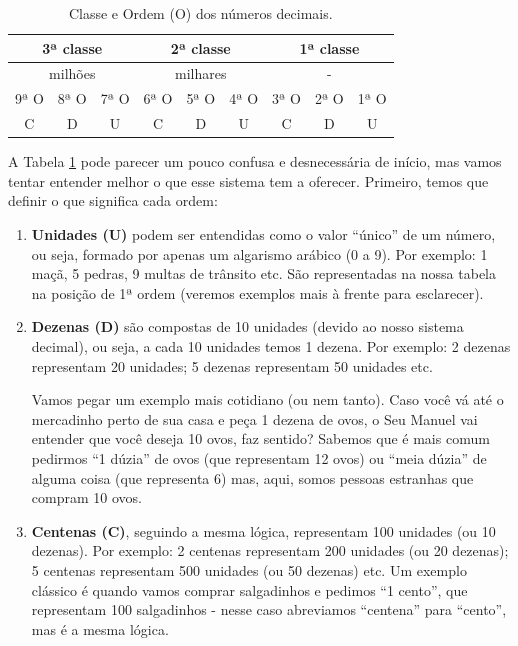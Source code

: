 \begin{table}[H]
\begin{tabular}{|ccc|ccc|ccc|}
\hline
\multicolumn{3}{|c|}{3ª classe}                               & \multicolumn{3}{c|}{2ª classe}                               & \multicolumn{3}{c|}{1ª classe}                               \\ \hline
\multicolumn{3}{|c|}{milhões}                                 & \multicolumn{3}{c|}{milhares}                                & \multicolumn{3}{c|}{-}                                       \\ \hline
\multicolumn{1}{|c|}{9ª O} & \multicolumn{1}{c|}{8ª O} & 7ª O & \multicolumn{1}{c|}{6ª O} & \multicolumn{1}{c|}{5ª O} & 4ª O & \multicolumn{1}{c|}{3ª O} & \multicolumn{1}{c|}{2ª O} & 1ª O \\ \hline
\multicolumn{1}{|c|}{C}    & \multicolumn{1}{c|}{D}    & U    & \multicolumn{1}{c|}{C}    & \multicolumn{1}{c|}{D}    & U    & \multicolumn{1}{c|}{C}    & \multicolumn{1}{c|}{D}    & U    \\ \hline
\end{tabular}

\caption{Classe e Ordem (O) dos números decimais.}
\label{ordemclasse}
\end{table}

A Tabela \ref{ordemclasse} pode parecer um pouco confusa e desnecessária de início, mas vamos tentar entender melhor o que esse sistema tem a oferecer. Primeiro, temos que definir o que significa cada ordem:

\begin{enumerate}

    \item \textbf{Unidades (U)} podem ser entendidas como o valor “único” de um número, ou seja, formado por apenas um algarismo arábico (0 a 9). Por exemplo: 1 maçã, 5 pedras, 9 multas de trânsito etc. São representadas na nossa tabela na posição de 1ª ordem (veremos exemplos mais à frente para esclarecer).
    \item \textbf{Dezenas (D)} são compostas de 10 unidades (devido ao nosso sistema decimal), ou seja, a cada 10 unidades temos 1 dezena. Por exemplo: 2 dezenas representam 20 unidades; 5 dezenas representam 50 unidades  etc. 
    
    Vamos pegar um exemplo mais cotidiano (ou nem tanto). Caso você vá até o mercadinho perto de sua casa e peça 1 dezena de ovos, o Seu Manuel vai entender que você deseja 10 ovos, faz sentido? Sabemos que é mais comum pedirmos “1 dúzia” de ovos (que representam 12 ovos) ou “meia dúzia” de alguma coisa (que representa 6) mas, aqui, somos pessoas estranhas que compram 10 ovos.
    
    \item \textbf{Centenas (C)}, seguindo a mesma lógica, representam 100 unidades (ou 10 dezenas). Por exemplo: 2 centenas representam 200 unidades (ou 20 dezenas); 5 centenas representam 500 unidades (ou 50 dezenas) etc. Um exemplo clássico é quando vamos comprar salgadinhos e pedimos “1 cento”, que representam 100 salgadinhos - nesse caso abreviamos “centena” para “cento”, mas é a mesma lógica.

\end{enumerate}

